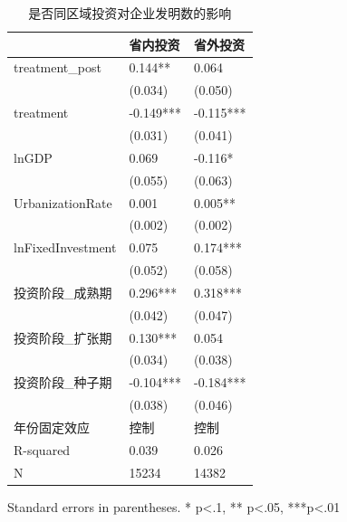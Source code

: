 \begin{table}
\caption{是否同区域投资对企业发明数的影响}
\label{}
\begin{center}
\begin{tabular}{lll}
\hline
                  & 省内投资      & 省外投资       \\
\hline
treatment\_post   & 0.144**    & 0.064     \\
                  & (0.034)   & (0.050)    \\
treatment         & -0.149*** & -0.115***  \\
                  & (0.031)   & (0.041)    \\
lnGDP             & 0.069     & -0.116*    \\
                  & (0.055)   & (0.063)    \\
UrbanizationRate              & 0.001     & 0.005**    \\
                  & (0.002)   & (0.002)    \\
lnFixedInvestment & 0.075     & 0.174***   \\
                  & (0.052)   & (0.058)    \\
投资阶段\_成熟期         & 0.296***  & 0.318***   \\
                  & (0.042)   & (0.047)    \\
投资阶段\_扩张期         & 0.130***  & 0.054      \\
                  & (0.034)   & (0.038)    \\
投资阶段\_种子期         & -0.104*** & -0.184***  \\
                  & (0.038)   & (0.046)    \\
年份固定效应  & 控制 & 控制\\ 
\hline

R-squared         & 0.039     & 0.026      \\
N                 & 15234     & 14382      \\
\hline
\end{tabular}
\end{center}
\end{table}
\bigskip
Standard errors in parentheses. \newline 
* p<.1, ** p<.05, ***p<.01

